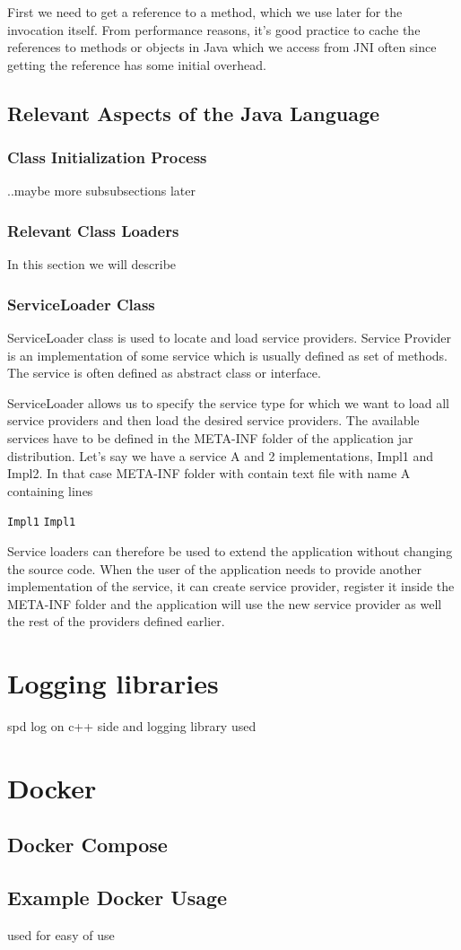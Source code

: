 First we need to get a reference to a method, which we use later for the invocation itself. From performance reasons, it's good practice to cache the references to methods or objects in Java which we access from JNI often since getting the reference has some initial overhead.

\subsection{Relevant Aspects of the  Java Language}

\subsubsection{Class Initialization Process}
..maybe more subsubsections later
\subsubsection{Relevant Class Loaders}
In this section we will describe
\subsubsection{ServiceLoader Class}
ServiceLoader class is used to locate and load service providers. Service Provider is an implementation of some service which is usually defined as set of methods. The service is often defined as abstract class or interface. 

ServiceLoader allows us to specify the service type for which we want to load all service providers and then load the desired service providers. The available services have to be defined in the META-INF folder of the application jar distribution. Let's say we have a service A and 2 implementations, Impl1 and Impl2. In that case META-INF folder with contain text file with name A containing lines
\begin{center}
 \texttt{Impl1} \newline
\texttt{Impl1}  \newline
\end{center}
Service loaders can therefore be used to extend the application without changing the source code. When the user of the application needs to provide another implementation of the service, it can create service provider, register it inside the META-INF folder and the application will use the new service provider as well the rest of the providers defined earlier.
\section{Logging libraries}
spd log on c++ side and 
logging library used
\section{Docker}
\subsection{Docker Compose}
\subsection{Example Docker Usage}
used for easy of use
